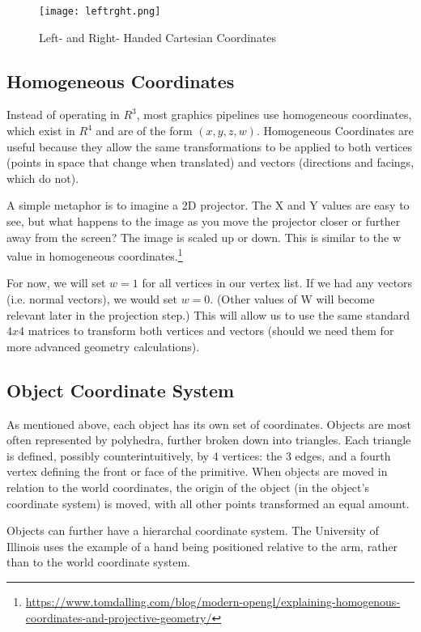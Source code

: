 \documentclass{article}
\begin{document}
\begin{figure}[H]
    \centering
    \texttt{[image: leftrght.png]}
    \caption{Left- and Right- Handed Cartesian Coordinates}
    \label{LeftRight}
\end{figure}

\subsection{Homogeneous Coordinates}
Instead of operating in $R^3$, most graphics pipelines use homogeneous coordinates, which exist in $R^4$ and are of the form $(x, y, z, w)$. Homogeneous Coordinates are useful because they allow the same transformations to be applied to both vertices (points in space that change when translated) and vectors (directions and facings, which do not).

A simple metaphor is to imagine a 2D projector. The X and Y values are easy to see, but what happens to the image as you move the projector closer or further away from the screen? The image is scaled up or down. This is similar to the w value in homogeneous coordinates.\footnote{\url{https://www.tomdalling.com/blog/modern-opengl/explaining-homogenous-coordinates-and-projective-geometry/}} 

For now, we will set $w = 1$ for all vertices in our vertex list. If we had any vectors (i.e. normal vectors), we would set $w = 0$. (Other values of W will become relevant later in the projection step.) This will allow us to use the same standard $4x4$ matrices to transform both vertices and vectors (should we need them for more advanced geometry calculations).

\subsection{Object Coordinate System}
As mentioned above, each object has its own set of coordinates. Objects are most often represented by polyhedra, further broken down into triangles. Each triangle is defined, possibly counterintuitively, by 4 vertices: the 3 edges, and a fourth vertex defining the front or face of the primitive. When objects are moved in relation to the world coordinates, the origin of the object (in the object's coordinate system) is moved, with all other points transformed an equal amount.

Objects can further have a hierarchal coordinate system. The University of Illinois uses the example of a hand being positioned relative to the arm, rather than to the world coordinate system. 
\end{document}

